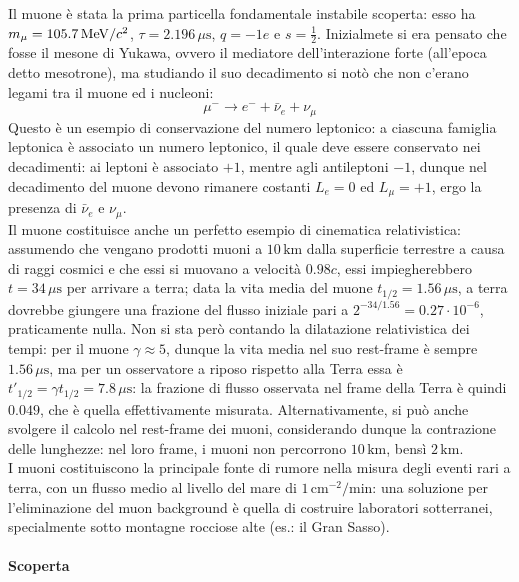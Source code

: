 Il muone è stata la prima particella fondamentale instabile scoperta: esso ha $ m_{\mu} = 105.7\,\mathrm{MeV}/c^2 $, $ \tau = 2.196\,\mu\text{s} $, $ q = -1e $ e $ s = \frac{1}{2} $. Inizialmete si era pensato che fosse il mesone di Yukawa, ovvero il mediatore dell'interazione forte (all'epoca detto mesotrone), ma studiando il suo decadimento si notò che non c'erano legami tra il muone ed i nucleoni:
\begin{equation*}
	\mu^- \rightarrow e^- + \bar{\nu}_e + \nu_{\mu}
\end{equation*}
Questo è un esempio di conservazione del numero leptonico: a ciascuna famiglia leptonica è associato un numero leptonico, il quale deve essere conservato nei decadimenti: ai leptoni è associato $ +1 $, mentre agli antileptoni $ -1 $, dunque nel decadimento del muone devono rimanere costanti $ L_e = 0 $ ed $ L_{\mu} = +1 $, ergo la presenza di $ \bar{\nu}_e $ e $ \nu_{\mu} $.\\
Il muone costituisce anche un perfetto esempio di cinematica relativistica: assumendo che vengano prodotti muoni a $ 10\,\text{km} $ dalla superficie terrestre a causa di raggi cosmici e che essi si muovano a velocità $ 0.98c $, essi impiegherebbero $ t = 34\,\mu\text{s} $ per arrivare a terra; data la vita media del muone $ t_{1/2} = 1.56\,\mu\text{s} $, a terra dovrebbe giungere una frazione del flusso iniziale pari a $ 2^{-34/1.56} = 0.27\cdot10^{-6} $, praticamente nulla. Non si sta però contando la dilatazione relativistica dei tempi: per il muone $ \gamma \approx 5 $, dunque la vita media nel suo rest-frame è sempre $ 1.56\,\mu\text{s} $, ma per un osservatore a riposo rispetto alla Terra essa è $ t'_{1/2} = \gamma t_{1/2} = 7.8\,\mu\text{s} $: la frazione di flusso osservata nel frame della Terra è quindi $ 0.049 $, che è quella effettivamente misurata. Alternativamente, si può anche svolgere il calcolo nel rest-frame dei muoni, considerando dunque la contrazione delle lunghezze: nel loro frame, i muoni non percorrono $ 10\,\text{km} $, bensì $ 2\,\text{km} $.\\
I muoni costituiscono la principale fonte di rumore nella misura degli eventi rari a terra, con un flusso medio al livello del mare di $ 1\,\text{cm}^{-2} / \text{min} $: una soluzione per l'eliminazione del muon background è quella di costruire laboratori sotterranei, specialmente sotto montagne rocciose alte (es.: il Gran Sasso).

\paragraph{Scoperta}

